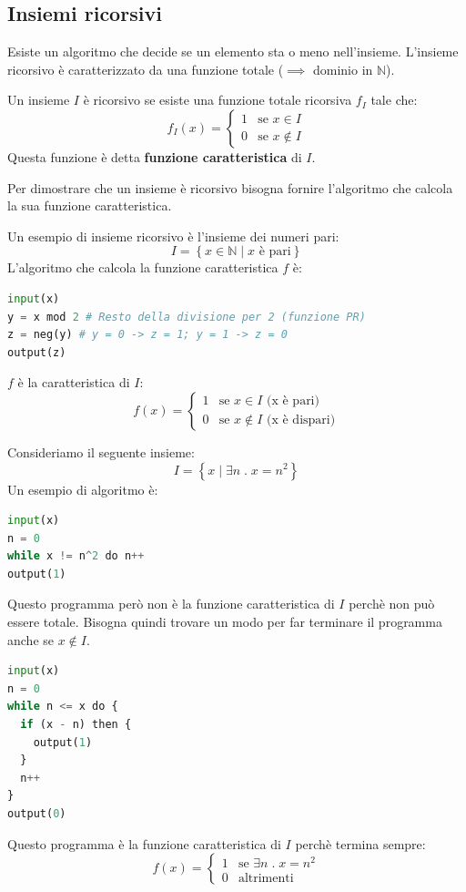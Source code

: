 \documentclass[a4paper]{article}
\begin{document}
\subsection{Insiemi ricorsivi}
Esiste un algoritmo che decide se un elemento sta o meno nell'insieme. L'insieme ricorsivo
è caratterizzato da una funzione totale (\( \implies \) dominio in \( \mathbb{N} \)).
\begin{definition}
  Un insieme \( I \) è ricorsivo se esiste una funzione totale ricorsiva \( f_I \) tale che:
  \[
    f_I(x) =
    \begin{cases}
      1 & \text{se } x \in I \\
      0 & \text{se } x \notin I
    \end{cases}
  \] 
  Questa funzione è detta \textbf{funzione caratteristica} di \( I \).
\end{definition}
Per dimostrare che un insieme è ricorsivo bisogna fornire l'algoritmo che calcola la
sua funzione caratteristica.
\begin{example}
  Un esempio di insieme ricorsivo è l'insieme dei numeri pari:
  \[
    I = \left\{ \left. x \in \mathbb{N} \;\right|\; x \text{ è pari} \right\}
  \] 
  L'algoritmo che calcola la funzione caratteristica \( f \) è:
\begin{lstlisting}[language=Python]
input(x)
y = x mod 2 # Resto della divisione per 2 (funzione PR)
z = neg(y) # y = 0 -> z = 1; y = 1 -> z = 0
output(z)
\end{lstlisting}
\( f \) è la caratteristica di \( I \):
\[
  f(x) = 
  \begin{cases}
    1 & \text{se } x \in I \text{ (x è pari)} \\
    0 & \text{se } x \notin I \text{ (x è dispari)}
  \end{cases}
\] 
\end{example}

\begin{example}
  Consideriamo il seguente insieme:
  \[
    I = \left\{ \left. x \;\right|\; \exists n \;.\; x = n^2 \right\}
  \] 
  Un esempio di algoritmo è:
\begin{lstlisting}[language=Python]
input(x)
n = 0
while x != n^2 do n++
output(1)
\end{lstlisting}
  Questo programma però non è la funzione caratteristica di \( I \) perchè non può essere
  totale. Bisogna quindi trovare un modo per far terminare il programma anche se \( x \notin I \).
\begin{lstlisting}[language=Python]
input(x)
n = 0
while n <= x do {
  if (x - n) then {
    output(1)
  }
  n++
}
output(0)
\end{lstlisting}
  Questo programma è la funzione caratteristica di \( I \) perchè termina sempre:
  \[
    f(x) =
    \begin{cases}
      1 & \text{se } \exists n \;.\; x = n^2 \\
      0 & \text{altrimenti}
    \end{cases}
  \]
\end{example}
\end{document}
